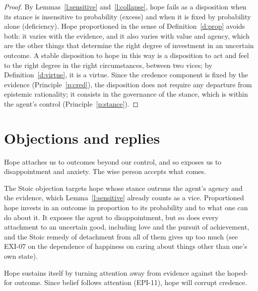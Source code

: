 \documentclass{situationist-preprint}
\begin{document}
\begin{proof}
By Lemmas~\ref{l:sensitive} and~\ref{l:collapse}, hope fails as a disposition when its stance is insensitive to probability (excess) and when it is fixed by probability alone (deficiency). Hope proportioned in the sense of Definition~\ref{d:prop} avoids both: it varies with the evidence, and it also varies with value and agency, which are the other things that determine the right degree of investment in an uncertain outcome. A stable disposition to hope in this way is a disposition to act and feel to the right degree in the right circumstances, between two vices; by Definition~\ref{d:virtue}, it is a virtue. Since the credence component is fixed by the evidence (Principle~\ref{p:cred}), the disposition does not require any departure from epistemic rationality; it consists in the governance of the stance, which is within the agent's control (Principle~\ref{p:stance}).
\end{proof}

\section{Objections and replies}

\begin{objection}[Stoic]\label{o:stoic}
Hope attaches us to outcomes beyond our control, and so exposes us to disappointment and anxiety. The wise person accepts what comes.
\end{objection}

\begin{reply}
The Stoic objection targets hope whose stance outruns the agent's agency and the evidence, which Lemma~\ref{l:sensitive} already counts as a vice. Proportioned hope invests in an outcome in proportion to its probability and to what one can do about it. It exposes the agent to disappointment, but so does every attachment to an uncertain good, including love and the pursuit of achievement, and the Stoic remedy of detachment from all of them gives up too much (see EXI-07 on the dependence of happiness on caring about things other than one's own state).
\end{reply}

\begin{objection}\label{o:deceive}
Hope sustains itself by turning attention away from evidence against the hoped-for outcome. Since belief follows attention (EPI-11), hope will corrupt credence.
\end{objection}
\end{document}
